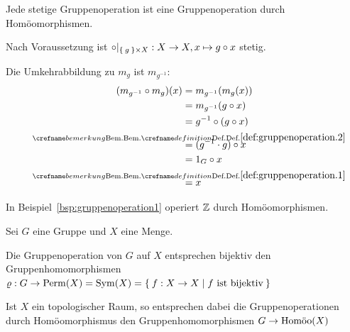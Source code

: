 \begin{bemerkung}%
     Jede stetige Gruppenoperation ist eine Gruppenoperation durch Homöomorphismen.
\end{bemerkung}
\begin{beweis}
    Nach Voraussetzung ist $\circ |_{\Set{g} \times X} : X \rightarrow X, x \mapsto g \circ x$ stetig.

    Die Umkehrabbildung zu $m_g$ ist $m_{g^{-1}}$: 
    \begin{align*}
        (m_{g^{-1}} \circ m_g)(x) &= m_{g^{-1}} (m_g (x))\\
            &= m_{g^{-1}} (g \circ x)\\
            &= g^{-1} \circ (g \circ x)\\
            &\overset{\mathclap{\crefabbr{def:gruppenoperation.2}}}{=} (g^{-1} \cdot g) \circ x\\
            &= 1_G \circ x\\
            &\overset{\mathclap{\crefabbr{def:gruppenoperation.1}}}{=} x
    \end{align*}
\end{beweis}

\begin{beispiel}
    In Beispiel~\ref{bsp:gruppenoperation1} operiert $\mdz$ durch Homöomorphismen.
\end{beispiel}

\begin{bemerkung}\label{kor:13.3}%
    Sei $G$ eine Gruppe und $X$ eine Menge.

    \begin{bemenum}
        \item Die Gruppenoperation von $G$ auf $X$ entsprechen bijektiv
              den Gruppenhomomorphismen $\varrho: G \rightarrow \Perm(X) = \Sym(X) = \Set{f: X \rightarrow X | f \text{ ist bijektiv}}$
        \item Ist $X$ ein topologischer Raum, so entsprechen dabei 
              die Gruppenoperationen durch Homöomorphismus den Gruppenhomomorphismen
              $G \rightarrow \Homoo(X)$
    \end{bemenum}
\end{bemerkung}

